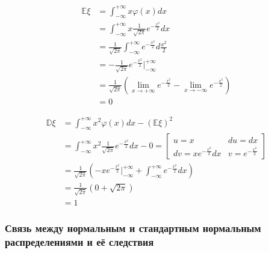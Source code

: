 \begin{align*}
    \mathbb{E}\xi & = \int_{-\infty}^{+\infty} x \varphi(x) dx                                                                                   \\
                  & = \int_{-\infty}^{+\infty} x \frac{1}{\sqrt{2\pi}} e^{ - \frac{x^2}{2}} dx                                                   \\
                  & = \frac{1}{\sqrt{2\pi}} \int_{-\infty}^{+\infty} e^{ - \frac{x^2}{2}} d \frac{x^2}{2}                                        \\
                  & = - \frac{1}{\sqrt{2\pi}} e^{ - \frac{x^2}{2}} \Big|_{-\infty}^{ +\infty}                                                    \\
                  & = \frac{1}{\sqrt{2\pi}} \left( \lim_{x \to +\infty} e^{ - \frac{x^2}{2}} - \lim_{x \to -\infty} e^{ - \frac{x^2}{2}} \right) \\
                  & = 0
\end{align*}

\begin{align*}
    \mathbb{D}\xi & = \int_{-\infty}^{+\infty} x^2 \varphi(x) dx - (\mathbb{E}\xi)^2                                                                              \\
                  & = \int_{-\infty}^{+\infty} x^2 \frac{1}{\sqrt{2\pi}} e^{ - \frac{x^2}{2}} dx - 0 = \begin{bmatrix}
        u = x                         & du = dx                  \\
        dv = xe^{ - \frac{x^2}{2}} dx & v = e^{ - \frac{x^2}{2}}
    \end{bmatrix}                                 \\
                  & = \frac{1}{\sqrt{2\pi}} \left( - xe^{ - \frac{x^2}{2}} \Big|_{ -\infty}^{+\infty} + \int_{ -\infty}^{+\infty} e^{ - \frac{x^2}{2}} dx \right) \\
                  & = \frac{1}{\sqrt{2\pi}} (0 + \sqrt{2\pi})                                                                                                     \\
                  & = 1
\end{align*}

\subsubsection{Связь между нормальным и стандартным нормальным распределениями и её следствия}

